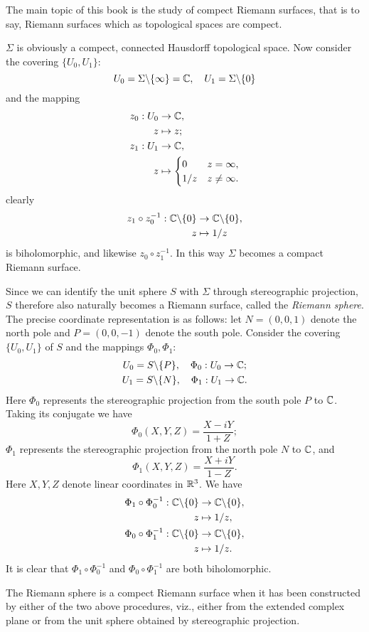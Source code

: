 The main topic of this book is the study of compect Riemann surfaces, that is to say, Riemann surfaces which as topological spaces are compect. 
\begin{example}[The set of extended complex numbers $\Sigma=\C\cup\{\infty\}$ (one point compactification of complex numbers)]
    $\Sigma$ is obviously a compect, connected Hausdorff topological space. Now consider the covering $\{U_0,U_1\}$: 
    \[U_0=\Sigma\backslash\{\infty\}=\mathbb{C}, \quad U_1=\Sigma\backslash\{0\}\]
    and the mapping 
    \begin{align*}
        z_0:U_0&\to\mathbb{C}, \\
        z&\mapsto z; \\
        z_1:U_1&\to\mathbb{C}, \\
        z&\mapsto\begin{cases}
            0&z=\infty, \\
            1/z&z\neq\infty. 
        \end{cases}
    \end{align*}
    clearly
    \begin{align*}
        z_1\circ z_0^{-1}:\mathbb{C}\backslash\{0\}&\to\mathbb{C}\backslash\{0\}, \\
        z&\mapsto1/z
    \end{align*}
    is biholomorphic, and likewise $z_0\circ z_1^{-1}$. In this way $\Sigma$ becomes a compact Riemann surface. 

    Since we can identify the unit sphere $S$ with $\Sigma$ through stereographic projection, $S$ therefore also naturally becomes a Riemann surface, called the \textit{Riemann sphere}. The precise coordinate representation is as follows: let $N=(0,0,1)$ denote the north pole and $P=(0,0,-1)$ denote the south pole. Consider the covering $\{U_0,U_1\}$ of $S$ and the mappings $\Phi_0,\Phi_1$: 
    \begin{gather*}
        U_0=S\backslash\{P\}, \quad\Phi_0:U_0\to\mathbb{C}; \\
        U_1=S\backslash\{N\}, \quad\Phi_1:U_1\to\mathbb{C}. 
    \end{gather*}
    Here $\Phi_0$ represents the stereographic projection from the south pole $P$ to $\mathbb{C}$. Taking its conjugate we have 
    \[\Phi_0(X,Y,Z)=\frac{X-iY}{1+Z}; \]
    $\Phi_1$ represents the stereographic projection from the north pole $N$ to $\mathbb{C}$, and 
    \[\Phi_1(X,Y,Z)=\frac{X+iY}{1-Z}. \]
    Here $X,Y,Z$ denote linear coordinates in $\mathbb{R}^3$. We have 
    \begin{align*}
        \Phi_1\circ\Phi_0^{-1}:\mathbb{C}\backslash\{0\}&\to\mathbb{C}\backslash\{0\}, \\
        z&\mapsto1/z, \\
        \Phi_0\circ\Phi_1^{-1}:\mathbb{C}\backslash\{0\}&\to\mathbb{C}\backslash\{0\}, \\
        z&\mapsto1/z. 
    \end{align*}
    It is clear that $\Phi_1\circ\Phi_0^{-1}$ and $\Phi_0\circ\Phi_1^{-1}$ are both biholomorphic. 

    The Riemann sphere is a compect Riemann surface when it has been constructed by either of the two above procedures, viz., either from the extended complex plane or from the unit sphere obtained by stereographic projection. 
\end{example}
